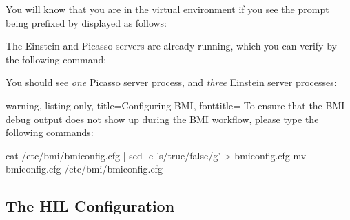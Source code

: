 You will know that you are in the virtual environment if you see the prompt being prefixed by  displayed as follows: 


The Einstein and Picasso servers are already running, which you can verify by the following command: \\


You should see \emph{one} Picasso server process, and \emph{three} Einstein server processes: 


\begin{tcblisting}{%
    warning,
    listing only, 
    title=Configuring BMI, fonttitle=\bfseries
  } 
To ensure that the BMI debug output does not show up during the BMI 
workflow, please type the following commands:

cat /etc/bmi/bmiconfig.cfg | sed -e 's/true/false/g' > bmiconfig.cfg 
mv bmiconfig.cfg /etc/bmi/bmiconfig.cfg 

\end{tcblisting}


\subsection{The HIL Configuration}

